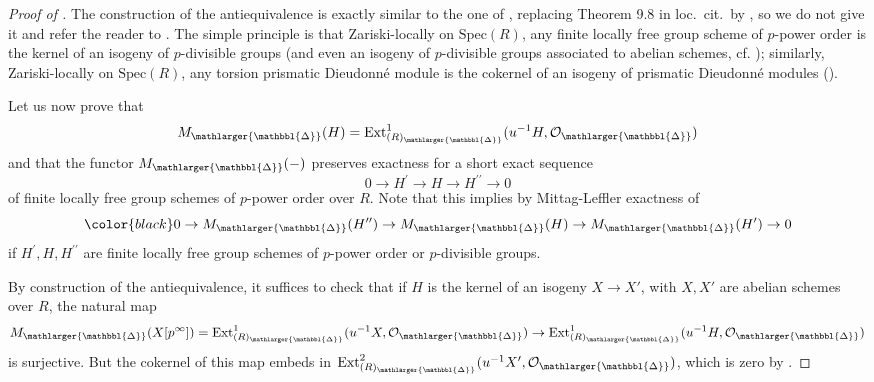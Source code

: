 \documentclass{amsart}
\newcommand{\prism}{{\mathlarger{\mathbbl{\Delta}}}}
\theoremstyle{plain}
\theoremstyle{definition}
\newcommand{\red}[1]{{\color{black} #1}}
\begin{document}
\begin{proof}[Proof of ]
The construction of the antiequivalence is exactly similar to the one of \cite[Theorem 10.12]{lau_dieudonne_theory_over_semiperfect_rings_and_perfectoid_rings}, replacing Theorem 9.8 in loc.\ cit.\ by , so we do not give it and refer the reader to \cite{lau_dieudonne_theory_over_semiperfect_rings_and_perfectoid_rings}. The simple principle is that Zariski-locally on $\mathrm{Spec}(R)$, any finite locally free group scheme of $p$-power order is the kernel of an isogeny of $p$-divisible groups (and even an isogeny of $p$-divisible groups associated to abelian schemes, cf. ); similarly, Zariski-locally on $\mathrm{Spec}(R)$, any torsion prismatic Dieudonn\'e module is the cokernel of an isogeny of prismatic Dieudonn\'e modules (\cite[Lemma 10.10]{lau_dieudonne_theory_over_semiperfect_rings_and_perfectoid_rings}). 


  Let us now prove that
  $$
  M_{\prism}(H)=\mathrm{Ext}_{(R)_{\prism}}^1(u^{-1} H, \mathcal{O}_{\prism})
  $$
  and that the functor $M_\prism(-)$ preserves exactness for a short exact sequence
  $$
  0\to H^\prime\to H\to H^{\prime\prime}\to 0
  $$
  of finite locally free group schemes of $p$-power order over $R$. Note that this implies by Mittag-Leffler exactness of
  $$
  \red{0\to M_\prism(H^{\prime\prime})\to M_\prism(H)\to M_\prism(H^{\prime})\to 0}
  $$
  if $H^\prime,H,H^{\prime\prime}$ are finite locally free group schemes of $p$-power order or $p$-divisible groups. 

By construction of the antiequivalence, it suffices to check that if $H$ is the kernel of an isogeny $X \to X'$, with $X, X'$ are abelian schemes over $R$, the natural map
\[ M_{\prism}(X[p^{\infty}])= \mathrm{Ext}_{(R)_{\prism}}^1(u^{-1} X, \mathcal{O}_{\prism})  \to \mathrm{Ext}_{(R)_{\prism}}^1(u^{-1} H, \mathcal{O}_{\prism})  \]
is surjective. But the cokernel of this map embeds in $\mathrm{Ext}_{(R)_{\prism}}^2(u^{-1} X', \mathcal{O}_{\prism})$, which is zero by .


\end{proof}
\end{document}
